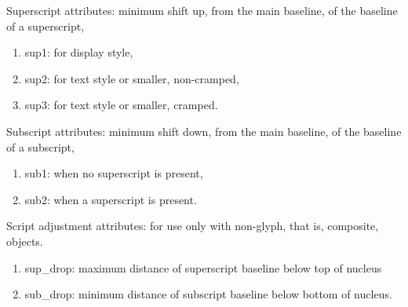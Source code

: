 \documentclass[twoside,letterpaper,openright]{rapport3}
\begin{document}
Superscript attributes: minimum shift up, from the main baseline,
of the baseline of a superscript,
\begin{enumerate} %
\item sup1:
for display style,
\item sup2:
for text style or smaller, non-cramped,
\item sup3:
for text style or smaller, cramped.
\end{enumerate}

Subscript attributes: minimum shift down, from the main baseline,
of the baseline of a subscript,
\begin{enumerate} %
\item sub1:
when no superscript is present,
\item sub2:
when a superscript is present.
\end{enumerate}

Script adjustment attributes: for use only with non-glyph,
that is, composite, objects.
\begin{enumerate} %
\item sup\_drop:
maximum distance of superscript baseline below top of nucleus
\item sub\_drop:
minimum distance of subscript baseline below bottom of nucleus.
\end{enumerate}
\end{document}
